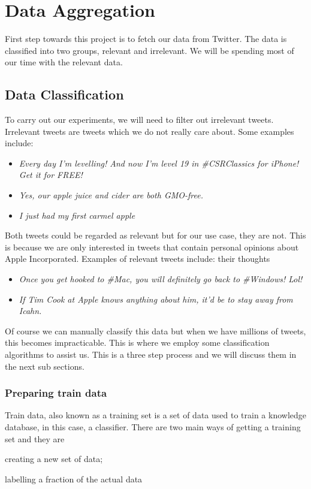 
\chapter{Data Aggregation}
First step towards this project is to fetch our data from Twitter. The data is classified into two
groups, relevant and irrelevant. We will be spending most of our time with the relevant data.


\section{Data Classification}
To carry out our experiments, we will need to filter out irrelevant tweets. Irrelevant tweets are
tweets which we do not really care about. Some examples include:

\begin{itemize}
  \item \textit{Every day I'm levelling! And now I'm level 19 in \#CSRClassics for iPhone! Get it for FREE!}
  \item \textit{Yes, our apple juice and cider are both GMO-free.}
  \item \textit{I just had my first carmel apple}
\end{itemize}

Both tweets could be regarded as relevant but for our use case, they are not. This is because we are
only interested in tweets that contain personal opinions about Apple Incorporated. Examples of
relevant tweets include:
their thoughts
\begin{itemize}
  \item \textit{Once you get hooked to \#Mac, you will definitely go back to \#Windows! Lol!}
  \item \textit{If Tim Cook at Apple knows anything about him, it'd be to stay away from Icahn.}
\end{itemize}

Of course we can manually classify this data but when we have millions of tweets, this becomes
impracticable. This is where we employ some classification algorithms to assist us. This is a
three step process and we will discuss them in the next sub sections.

\subsection{Preparing train data}
Train data, also known as a training set is a set of data used to train a knowledge database, in
this case, a classifier. There are two main ways of getting a training set and they are
\begin{enumerate*} [label=\itshape\alph*\upshape)]
  \item creating a new set of data;
  \item labelling a fraction of the actual data
\end{enumerate*}

